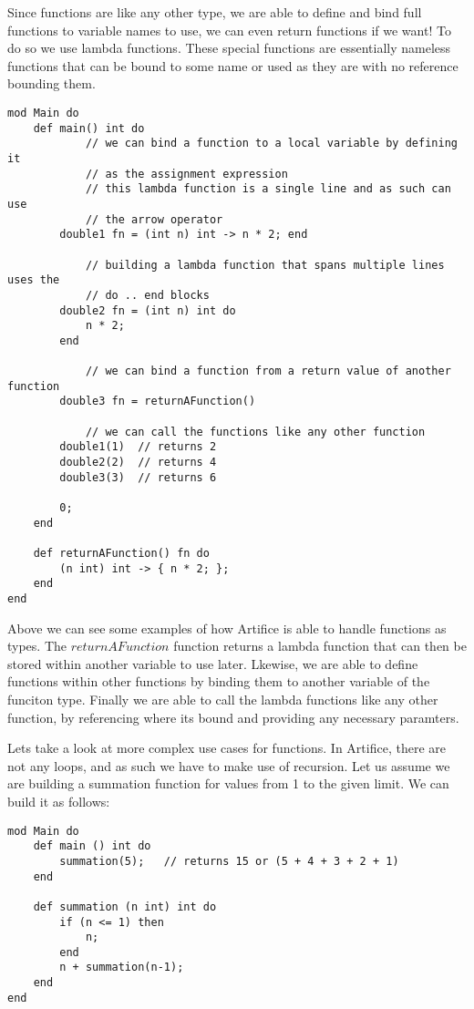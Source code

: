 \documentclass{article}
\begin{document}
Since functions are like any other type, we are able to define and bind full functions to variable names to use, we can even return functions if we want!
To do so we use lambda functions. These special functions are essentially nameless functions that can be bound to some name or used as they are
with no reference bounding them.

\begin{lstlisting}
mod Main do
	def main() int do
			// we can bind a function to a local variable by defining it 
			// as the assignment expression
			// this lambda function is a single line and as such can use
			// the arrow operator
		double1 fn = (int n) int -> n * 2; end

			// building a lambda function that spans multiple lines uses the
			// do .. end blocks
		double2 fn = (int n) int do
			n * 2;
		end

			// we can bind a function from a return value of another function
		double3 fn = returnAFunction()

			// we can call the functions like any other function
		double1(1)  // returns 2
		double2(2)  // returns 4
		double3(3)  // returns 6

		0;
	end

	def returnAFunction() fn do
		(n int) int -> { n * 2; };
	end
end
\end{lstlisting}

Above we can see some examples of how Artifice is able to handle functions as types. The $returnAFunction$ function returns a lambda function
that can then be stored within another variable to use later. Lkewise, we are able to define functions within other functions by binding them
to another variable of the funciton type. Finally we are able to call the lambda functions like any other function, by referencing where its
bound and providing any necessary paramters.

Lets take a look at more complex use cases for functions. In Artifice, there are not any loops, and as such we have to make use of recursion.
Let us assume we are building a summation function for values from 1 to the given limit. We can build it as follows:

\begin{lstlisting}
mod Main do
	def main () int do
		summation(5); 	// returns 15 or (5 + 4 + 3 + 2 + 1)
	end

	def summation (n int) int do
		if (n <= 1) then
			n;
		end
		n + summation(n-1);
	end
end
\end{lstlisting}
\end{document}
